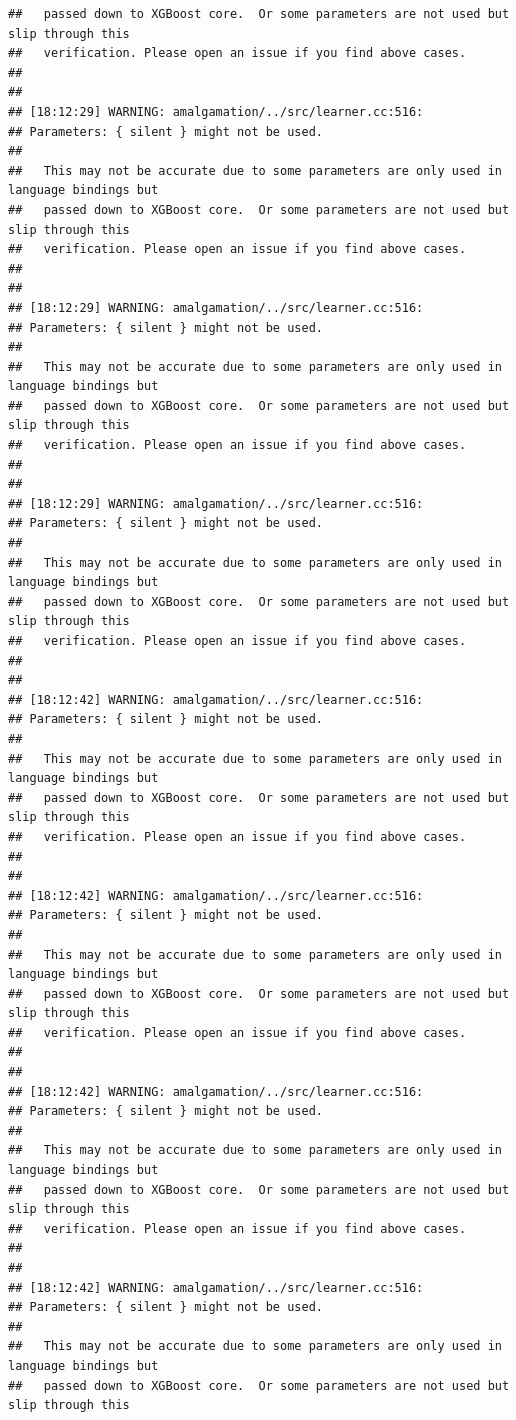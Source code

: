 \documentclass[AMS,STIX2COL]{WileyNJD-v2}\usepackage[]{graphicx}\usepackage[]{color}
\makeatletter
\newenvironment{kframe}{%
 \def\at@end@of@kframe{}%
 \ifinner\ifhmode%
  \def\at@end@of@kframe{\end{minipage}}%
  \begin{minipage}{\columnwidth}%
 \fi\fi%
 \def\FrameCommand##1{\hskip\@totalleftmargin \hskip-\fboxsep
 \colorbox{shadecolor}{##1}\hskip-\fboxsep
     \hskip-\linewidth \hskip-\@totalleftmargin \hskip\columnwidth}%
 \MakeFramed {\advance\hsize-\width
   \@totalleftmargin\z@ \linewidth\hsize
   \@setminipage}}%
 {\par\unskip\endMakeFramed%
 \at@end@of@kframe}
\newenvironment{knitrout}{}{} %
\makeatother
\begin{document}
\begin{knitrout}
\begin{kframe}
\begin{verbatim}
##   passed down to XGBoost core.  Or some parameters are not used but slip through this
##   verification. Please open an issue if you find above cases.
## 
## 
## [18:12:29] WARNING: amalgamation/../src/learner.cc:516: 
## Parameters: { silent } might not be used.
## 
##   This may not be accurate due to some parameters are only used in language bindings but
##   passed down to XGBoost core.  Or some parameters are not used but slip through this
##   verification. Please open an issue if you find above cases.
## 
## 
## [18:12:29] WARNING: amalgamation/../src/learner.cc:516: 
## Parameters: { silent } might not be used.
## 
##   This may not be accurate due to some parameters are only used in language bindings but
##   passed down to XGBoost core.  Or some parameters are not used but slip through this
##   verification. Please open an issue if you find above cases.
## 
## 
## [18:12:29] WARNING: amalgamation/../src/learner.cc:516: 
## Parameters: { silent } might not be used.
## 
##   This may not be accurate due to some parameters are only used in language bindings but
##   passed down to XGBoost core.  Or some parameters are not used but slip through this
##   verification. Please open an issue if you find above cases.
## 
## 
## [18:12:42] WARNING: amalgamation/../src/learner.cc:516: 
## Parameters: { silent } might not be used.
## 
##   This may not be accurate due to some parameters are only used in language bindings but
##   passed down to XGBoost core.  Or some parameters are not used but slip through this
##   verification. Please open an issue if you find above cases.
## 
## 
## [18:12:42] WARNING: amalgamation/../src/learner.cc:516: 
## Parameters: { silent } might not be used.
## 
##   This may not be accurate due to some parameters are only used in language bindings but
##   passed down to XGBoost core.  Or some parameters are not used but slip through this
##   verification. Please open an issue if you find above cases.
## 
## 
## [18:12:42] WARNING: amalgamation/../src/learner.cc:516: 
## Parameters: { silent } might not be used.
## 
##   This may not be accurate due to some parameters are only used in language bindings but
##   passed down to XGBoost core.  Or some parameters are not used but slip through this
##   verification. Please open an issue if you find above cases.
## 
## 
## [18:12:42] WARNING: amalgamation/../src/learner.cc:516: 
## Parameters: { silent } might not be used.
## 
##   This may not be accurate due to some parameters are only used in language bindings but
##   passed down to XGBoost core.  Or some parameters are not used but slip through this

\end{verbatim}
\end{kframe}
\end{knitrout}
\end{document}
